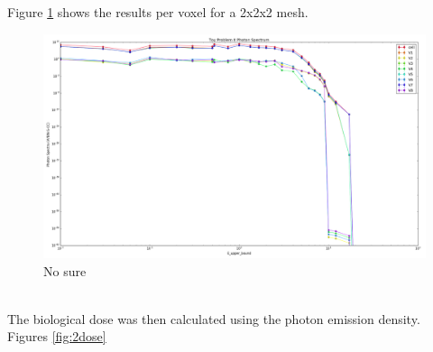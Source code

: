Figure \ref{fig:2spec_8v} shows the results per voxel for a 2x2x2 mesh.
\begin{figure}
	\centering
	\includegraphics[scale=0.3, trim={0cm 0cm 0cm 1cm},clip]{../figs/toy_p2/spec_VPII_8.png}
	\caption{No sure}
	\label{fig:2spec_8v}
\end{figure}
\\
The biological dose was then calculated using the photon emission density.
Figures \ref{fig:2dose}
%
